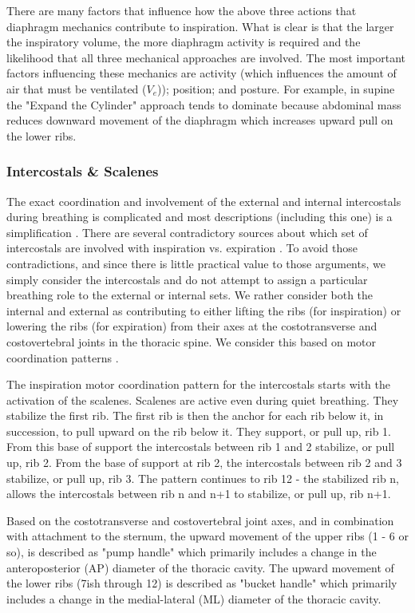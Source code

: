 There are many factors that influence how the above three actions that diaphragm mechanics contribute to inspiration. What is clear is that the larger the inspiratory volume, the more diaphragm activity is required and the likelihood that all three mechanical approaches are involved. The most important factors influencing these mechanics are activity (which influences the amount of air that must be ventilated ($V_e$)); position; and posture. For example, in supine the "Expand the Cylinder" approach tends to dominate because abdominal mass reduces downward movement of the diaphragm which increases upward pull on the lower ribs.

\subsubsection{Intercostals \& Scalenes}

The exact coordination and involvement of the external and internal intercostals during breathing is complicated and most descriptions (including this one) is a simplification \cite{lumb_nunns_2020, de_troyer_respiratory_2005}. There are several contradictory sources about which set of intercostals are involved with inspiration vs. expiration \cite{lumb_nunns_2020, hall_guyton_2020}. To avoid those contradictions, and since there is little practical value to those arguments, we simply consider the intercostals and do not attempt to assign a particular breathing role to the external or internal sets. We rather consider both the internal and external as contributing to either lifting the ribs (for inspiration) or lowering the ribs (for expiration) from their axes at the costotransverse and costovertebral joints in the thoracic spine. We consider this based on motor coordination patterns \cite{gilbert_recognizing_2014}.

The inspiration motor coordination pattern for the intercostals starts with the activation of the scalenes. Scalenes are active even during quiet breathing. They stabilize the first rib. The first rib is then the anchor for each rib below it, in succession, to pull upward on the rib below it. They support, or pull up, rib 1. From this base of support the intercostals between rib 1 and 2 stabilize, or pull up, rib 2. From the base of support at rib 2, the intercostals between rib 2 and 3 stabilize, or pull up, rib 3. The pattern continues to rib 12 - the stabilized rib n, allows the intercostals between rib n and n+1 to stabilize, or pull up, rib n+1.

Based on the costotransverse and costovertebral joint axes, and in combination with attachment to the sternum, the upward movement of the upper ribs (1 - 6 or so), is described as "pump handle" which primarily includes a change in the anteroposterior (AP) diameter of the thoracic cavity. The upward movement of the lower ribs (7ish through 12) is described as "bucket handle" which primarily includes a change in the medial-lateral (ML) diameter of the thoracic cavity.

